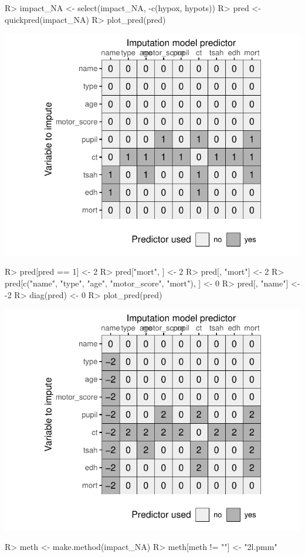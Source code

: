 \documentclass[
]{jss}
\begin{document}
\begin{CodeChunk}
\begin{CodeInput}
R> impact_NA <- select(impact_NA, -c(hypox, hypots))
R> pred <- quickpred(impact_NA)
R> plot_pred(pred)
\end{CodeInput}


\begin{center}\includegraphics{Imputation_of_Incomplete_Multilevel_Data_files/figure-latex/impact-pred-1} \end{center}

\begin{CodeInput}
R> pred[pred == 1] <- 2
R> pred["mort", ] <- 2
R> pred[, "mort"] <- 2
R> pred[c("name", "type", "age", "motor_score", "mort"), ] <- 0
R> pred[, "name"] <- -2
R> diag(pred) <- 0
R> plot_pred(pred)
\end{CodeInput}


\begin{center}\includegraphics{Imputation_of_Incomplete_Multilevel_Data_files/figure-latex/impact-pred-2} \end{center}

\begin{CodeInput}
R> meth <- make.method(impact_NA)
R> meth[meth != ""] <- "2l.pmm"
\end{CodeInput}
\end{CodeChunk}
\end{document}
